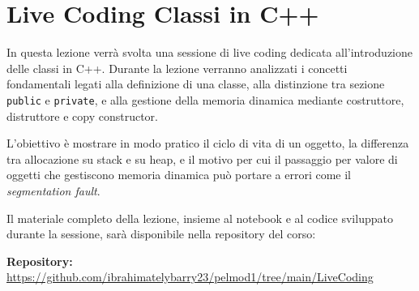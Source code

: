 \section{Live Coding  Classi in C++}

In questa lezione verrà svolta una sessione di live coding dedicata
all'introduzione delle classi in C++. Durante la lezione verranno
analizzati i concetti fondamentali legati alla definizione di una classe,
alla distinzione tra sezione \texttt{public} e \texttt{private}, e alla
gestione della memoria dinamica mediante costruttore, distruttore e
copy constructor.

L'obiettivo è mostrare in modo pratico il ciclo di vita di un oggetto,
la differenza tra allocazione su stack e su heap, e il motivo per cui
il passaggio per valore di oggetti che gestiscono memoria dinamica può
portare a errori come il \textit{segmentation fault}.

Il materiale completo della lezione, insieme al notebook e al codice
sviluppato durante la sessione, sarà disponibile nella repository del corso:

\noindent\textbf{Repository:} \url{https://github.com/ibrahimatelybarry23/pelmod1/tree/main/LiveCoding}
